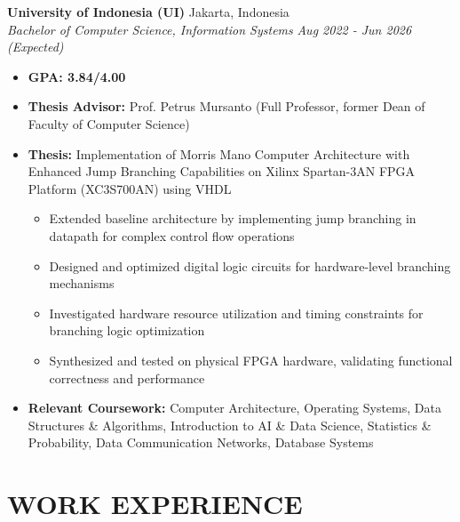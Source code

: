 \documentclass[10pt,a4paper]{article}
\newcommand{\experienceheader}[4]{
    \textbf{#1} \hfill #2 \\
    \textit{#3} \hfill \textit{#4}
}
\begin{document}
\experienceheader{University of Indonesia (UI)}{Jakarta, Indonesia}{Bachelor of Computer Science, Information Systems}{Aug 2022 - Jun 2026 (Expected)}
\begin{itemize}[leftmargin=*, itemsep=1pt, topsep=1pt]
    \item \textbf{GPA: 3.84/4.00}
    \item \textbf{Thesis Advisor:} Prof. Petrus Mursanto (Full Professor, former Dean of Faculty of Computer Science)
    \item \textbf{Thesis:} Implementation of Morris Mano Computer Architecture with Enhanced Jump Branching Capabilities on Xilinx Spartan-3AN FPGA Platform (XC3S700AN) using VHDL
    \begin{itemize}[leftmargin=*, itemsep=0.5pt, topsep=0.5pt]
        \item Extended baseline architecture by implementing jump branching in datapath for complex control flow operations
        \item Designed and optimized digital logic circuits for hardware-level branching mechanisms
        \item Investigated hardware resource utilization and timing constraints for branching logic optimization
        \item Synthesized and tested on physical FPGA hardware, validating functional correctness and performance
    \end{itemize}
    \item \textbf{Relevant Coursework:} Computer Architecture, Operating Systems, Data Structures \& Algorithms, Introduction to AI \& Data Science, Statistics \& Probability, Data Communication Networks, Database Systems
\end{itemize}


\section*{WORK EXPERIENCE}
\end{document}

